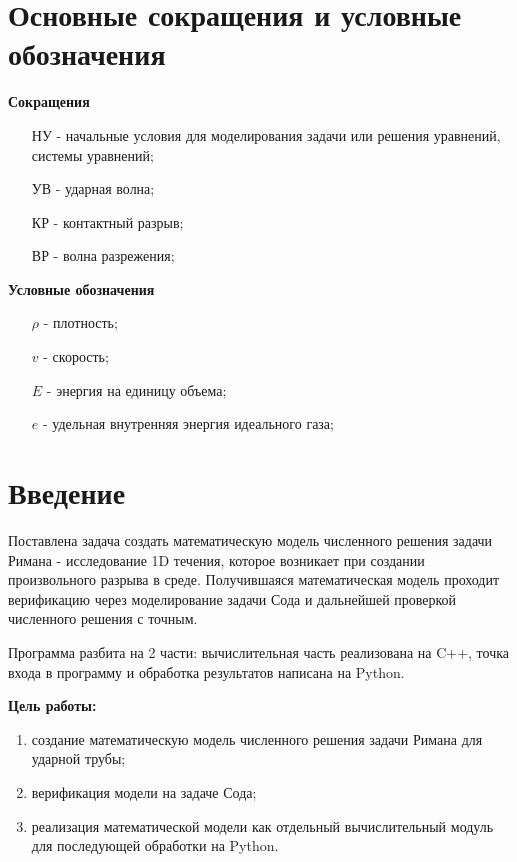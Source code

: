 





 

\newpage
 
 \hypersetup{linkcolor=black}
\tableofcontents

\newpage
\part*{Основные сокращения и условные обозначения}

\textbf{Сокращения}
\begin{itemize}
\item[НУ] - начальные условия для моделирования задачи или решения уравнений, системы уравнений;
\item[УВ] - ударная волна;
\item[КР] - контактный разрыв;
\item[ВР] - волна разрежения;
\end{itemize}

\textbf{Условные обозначения}
\begin{itemize}
\item [$\rho$] - плотность;
\item [$v$] - скорость;
\item [$E$] - энергия на единицу объема;
\item [$e$] - удельная внутренняя энергия идеального газа;
\end{itemize}
 
\newpage
\part*{Введение}\label{part_intro}

Поставлена задача создать математическую модель численного решения задачи Римана - исследование 1D течения, которое возникает при создании произвольного разрыва в среде. Получившаяся математическая модель проходит верификацию через моделирование задачи Сода и дальнейшей проверкой численного решения с точным.

Программа разбита на 2 части: вычислительная часть реализована на C++, точка входа в программу и обработка результатов написана на Python.

\textbf{Цель работы:}
\begin{enumerate}
\item создание математическую модель численного решения задачи Римана для ударной трубы;
\item верификация модели на задаче Сода;
\item реализация математической модели как отдельный вычислительный модуль для последующей обработки на Python.
\end{enumerate}

